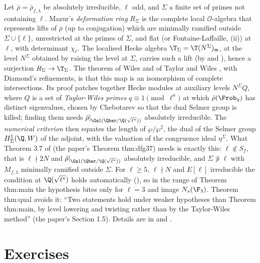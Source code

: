 \begin{remark}[Taylor-Wiles and $R=\T$ in one page]\label{rem:modgalrep:taylor-wiles}
Let $\bar\rho=\bar\rho_{f,\lambda}$ be absolutely irreducible, $\ell$ odd, and $\Sigma$ a finite set of primes not containing $\ell$. Mazur's \emph{deformation ring} $R_\Sigma$ is the
complete local $\mathcal{O}$-algebra that represents lifts of $\bar\rho$ (up to conjugation) which are minimally ramified outside $\Sigma\cup\{\ell\}$, unrestricted at the primes of
$\Sigma$, and flat (or Fontaine-Laffaille, (ii)) at $\ell$, with determinant $\chi_\ell$. The localised Hecke algebra $\T_\Sigma=\T(N^\Sigma)_{\mathfrak m}$, at the
level $N^\Sigma$ obtained by raising the level at $\Sigma$, carries such a lift (by  and ), hence a surjection
$R_\Sigma\to\T_\Sigma$. The theorem of Wiles and of Taylor and Wiles \cite{Wiles95,TaylorWiles}, with Diamond's refinements, is that this map is an isomorphism of
complete intersections. Its proof patches together Hecke modules at auxiliary levels $N^\Sigma Q$, where $Q$ is a set of \emph{Taylor-Wiles primes} $q\equiv1\pmod{\ell^n}$ at which
$\bar\rho(\Frob_q)$ has distinct eigenvalues, chosen by Chebotarev so that the dual Selmer group is killed; finding them needs $\bar\rho|_{\Gal(\Qbar/\Q(\sqrt{\ell^*}))}$
absolutely irreducible. The \emph{numerical criterion} then equates the length of $\wp/\wp^2$, the dual of the Selmer group $H^1_\Sigma(\Q,W)$ of the adjoint, with
the valuation of the congruence ideal $\eta^\Sigma$. What Theorem 3.7 of \cite{DFG04} (the paper's Theorem thm:dfg37) needs is exactly this: $\ell\notin S_f$, that is
$\ell\nmid2N$ and $\bar\rho|_{\Gal(\Qbar/\Q(\sqrt{\ell^*}))}$ absolutely irreducible, and $\Sigma\not\ni\ell$ with $M_{f,\lambda}$ minimally ramified outside $\Sigma$. For $\ell\ge5$, $\ell\nmid N$ and
$E[\ell]$ irreducible the condition at $\Q(\sqrt{\ell^*})$ holds automatically (), so in the range of Theorem thm:main the hypothesis bites only for $\ell=3$
and image $N_s(\F_3)$. Theorem thm:qual avoids it: ``Two statements hold under weaker hypotheses than Theorem thm:main, by level lowering and twisting
rather than by the Taylor-Wiles method'' (the paper's Section 1.5). Details are in  and \cite{DDT}.
\end{remark}

\section{Exercises}\label{sec:modgalrep:exercises}

